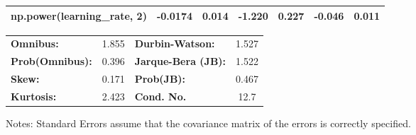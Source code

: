 \begin{center}
\begin{tabular}{lcccccc}
\textbf{np.power(learning\_rate, 2)}      &      -0.0174  &        0.014     &    -1.220  &         0.227        &       -0.046    &        0.011     \\
\bottomrule
\end{tabular}
\begin{tabular}{lclc}
\textbf{Omnibus:}       &  1.855 & \textbf{  Durbin-Watson:     } &    1.527  \\
\textbf{Prob(Omnibus):} &  0.396 & \textbf{  Jarque-Bera (JB):  } &    1.522  \\
\textbf{Skew:}          &  0.171 & \textbf{  Prob(JB):          } &    0.467  \\
\textbf{Kurtosis:}      &  2.423 & \textbf{  Cond. No.          } &     12.7  \\
\bottomrule
\end{tabular}
\end{center}

Notes: \newline
 [1] Standard Errors assume that the covariance matrix of the errors is correctly specified.